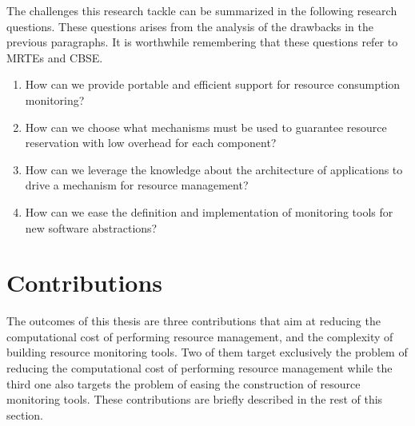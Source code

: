 The challenges this research tackle can be summarized in the following research questions.
These questions arises from the analysis of the drawbacks in the previous paragraphs.
It is worthwhile remembering that these questions refer to MRTEs and CBSE.

\begin{enumerate}
\renewcommand{\theenumi}{\textit{RQ\arabic{enumi}}}

\item How can we provide portable and efficient support for resource consumption monitoring? \label{rq:rq1}

\item How can we choose what mechanisms must be used to guarantee resource reservation with low overhead for each component? \label{rq:rq2}

\item How can we leverage the knowledge about the architecture of applications to drive a mechanism for resource management? \label{rq:rq3}

\item How can we ease the definition and implementation of monitoring tools for new software abstractions? \label{rq:rq4}
\end{enumerate}
 
\section{Contributions}

The outcomes of this thesis are three contributions that aim at reducing the computational cost of performing resource management, and the complexity of building resource monitoring tools.
Two of them target exclusively the problem of reducing the computational cost of performing resource management while the third one also targets the problem of easing the construction of resource monitoring tools. 
These contributions are briefly described in the rest of this section.


